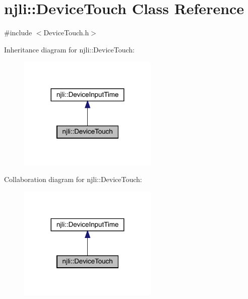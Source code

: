 \hypertarget{classnjli_1_1_device_touch}{}\section{njli\+:\+:Device\+Touch Class Reference}
\label{classnjli_1_1_device_touch}


{\ttfamily \#include $<$Device\+Touch.\+h$>$}



Inheritance diagram for njli\+:\+:Device\+Touch\+:\nopagebreak
\begin{figure}[H]
\begin{center}
\leavevmode
\includegraphics[width=188pt]{classnjli_1_1_device_touch__inherit__graph}
\end{center}
\end{figure}


Collaboration diagram for njli\+:\+:Device\+Touch\+:\nopagebreak
\begin{figure}[H]
\begin{center}
\leavevmode
\includegraphics[width=188pt]{classnjli_1_1_device_touch__coll__graph}
\end{center}
\end{figure}
